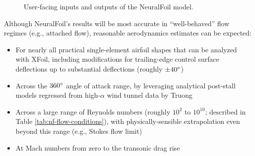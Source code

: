 \begin{figure}[H]
    \caption{User-facing inputs and outputs of the NeuralFoil model.}
    \label{fig:neuralfoil_io}
\end{figure}

\noindent Although NeuralFoil's results will be most accurate in ``well-behaved'' flow regimes (e.g., attached flow), reasonable aerodynamics estimates can be expected:
\begin{itemize}
    \item For nearly all practical single-element airfoil shapes that can be analyzed with XFoil, including modifications for trailing-edge control surface deflections up to substantial deflections (roughly $\pm 40\degree$)
    \item Across the $360\degree$ angle of attack range, by leveraging analytical post-stall models regressed from high-$\alpha$ wind tunnel data by Truong \cite{truong_analytical_2020}
    \item Across a large range of Reynolds numbers (roughly $10^2$ to $10^{10}$; described in Table \ref{tab:nf-flow-conditions}), with physically-sensible extrapolation even beyond this range (e.g., Stokes flow limit)
    \item At Mach numbers from zero to the transonic drag rise
\end{itemize}

